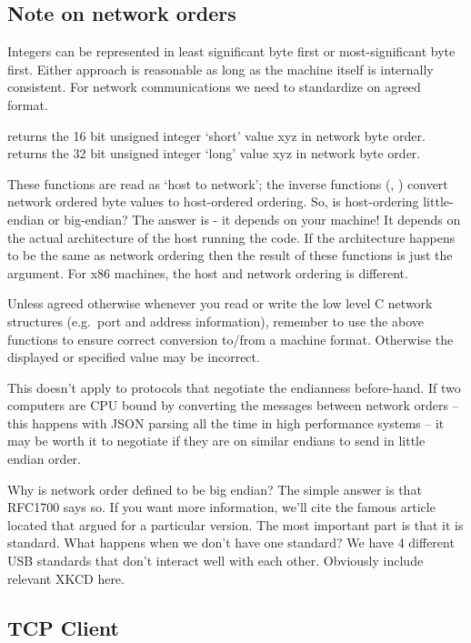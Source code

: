 \subsection{Note on network orders}

Integers can be represented in least significant byte first or most-significant byte first.
Either approach is reasonable as long as the machine itself is internally consistent.
For network communications we need to standardize on agreed format.

 returns the 16 bit unsigned integer `short' value xyz in network byte order.
 returns the 32 bit unsigned integer `long' value xyz in network byte order.

These functions are read as `host to network'; the inverse functions (, ) convert network ordered byte values to host-ordered ordering.
So, is host-ordering little-endian or big-endian? The answer is - it depends on your machine! It depends on the actual architecture of the host running the code.
If the architecture happens to be the same as network ordering then the result of these functions is just the argument.
For x86 machines, the host and network ordering is different.

Unless agreed otherwise whenever you read or write the low level C network structures (e.g.~port and address information), remember to use the above functions to ensure correct conversion to/from a machine format.
Otherwise the displayed or specified value may be incorrect.


This doesn't apply to protocols that negotiate the endianness before-hand.
If two computers are CPU bound by converting the messages between network orders -- this happens with JSON parsing all the time in high performance systems -- it may be worth it to negotiate if they are on similar endians to send in little endian order.

Why is network order defined to be big endian? The simple answer is that  RFC1700 says so.
If you want more information, we'll cite the famous article located  that argued for a particular version.
The most important part is that it is standard.
What happens when we don't have one standard? We have 4 different USB standards that don't interact well with each other.
Obviously include relevant XKCD here.

\subsection{TCP Client}

